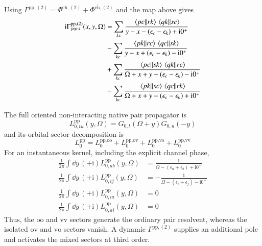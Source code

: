 \documentclass[aip,jcp,reprint,noshowkeys,superscriptaddress]{revtex4-1}
\newcommand{\eps}{\epsilon}
\newcommand{\ii}{\mathrm{i}}
\newcommand{\eh}{\text{eh}}
\newcommand{\teh}{\overline{\text{eh}}}
\newcommand{\pp}{\text{pp}}
\begin{document}
Using
$\Gamma^{\pp,(2)}=\Phi^{\eh,(2)}+\Phi^{\teh,(2)}$
and the map above gives
\begin{equation}
\begin{split}
    \ii\Gamma^{\pp,(2)}_{pqrs}(x,y,\Omega)
    &=
    \sum_{kc}
    \frac{
    \mel{pc}{}{rk}\mel{qk}{}{sc}
    }
    {y-x-(\eps_c-\eps_k)+\ii0^+}
    \\
    & -
    \sum_{kc}
    \frac{
    \mel{pk}{}{rc}\mel{qc}{}{sk}
    }
    {y-x+(\eps_c-\eps_k)-\ii0^+}
    \\
    &+
    \sum_{kc}
    \frac{
    \mel{pc}{}{sk}\mel{qk}{}{rc}
    }
    {\Omega+x+y+(\eps_c-\eps_k)-\ii0^+}
    \\
    & -
    \sum_{kc}
    \frac{
    \mel{pk}{}{sc}\mel{qc}{}{rk}
    }
    {\Omega+x+y-(\eps_c-\eps_k)+\ii0^+}
\end{split}
\label{eq:Gamma_pp_second_native_third}
\end{equation}

The full oriented non-interacting
native pair propagator is
\begin{equation}
    L_{0,tu}^{\pp}(y,\Omega)
    =
    G_{0,t}(\Omega+y)G_{0,u}(-y)
    \label{eq:L0_pp_oriented}
\end{equation}
and its orbital-sector decomposition is
\begin{equation}
    L_0^\pp
    =
    L_0^{\pp,\text{oo}}
    +
    L_0^{\pp,\text{ov}}
    +
    L_0^{\pp,\text{vo}}
    +
    L_0^{\pp,\text{vv}}
    \label{eq:L0_pp_sector_decomposition}
\end{equation}
For an instantaneous kernel, including the explicit channel phase,
\begin{align}
    \frac{1}{2\pi}\int\dd{y}\,
    (+\ii) L_{0,ab}^{\pp}(y,\Omega)
    &=
    \frac{1}{\Omega-(\eps_a+\eps_b)+\ii0^+}
    \label{eq:pp_vv_integral}
    \\
    \frac{1}{2\pi}\int\dd{y}\,
    (+\ii) L_{0,ij}^{\pp}(y,\Omega)
    &=
    -\frac{1}{\Omega-(\eps_i+\eps_j)-\ii0^+}
    \label{eq:pp_oo_integral}
    \\
    \frac{1}{2\pi}\int\dd{y}\,
    (+\ii) L_{0,ia}^{\pp}(y,\Omega)
    &=0
    \\
    \frac{1}{2\pi}\int\dd{y}\,
    (+\ii) L_{0,ai}^{\pp}(y,\Omega)
    &=0
    \label{eq:pp_mixed_integrals_zero}
\end{align}
Thus, the $\text{oo}$ and $\text{vv}$ sectors generate the ordinary pair resolvent, whereas
the isolated $\text{ov}$ and $\text{vo}$ sectors vanish.
A dynamic $\Gamma^{\pp,(2)}$ supplies an additional pole and activates the
mixed sectors at third order.
\end{document}

